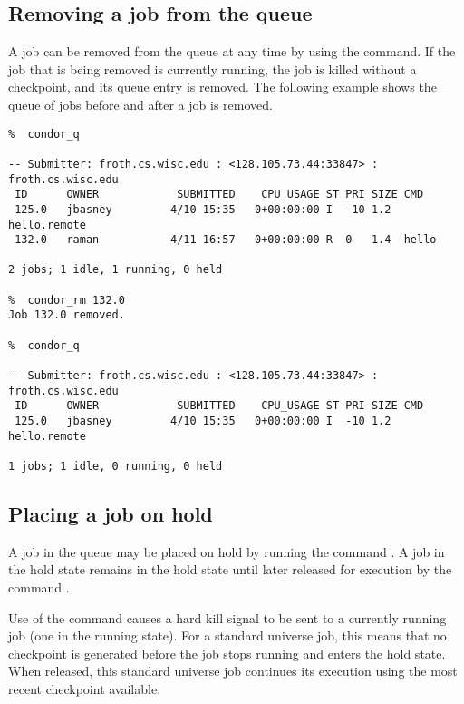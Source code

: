 \subsection{Removing a job from the queue}
A job can be removed from the queue at any time by using the 
command.  If the job that is being removed is currently running, the job
is killed without a checkpoint, and its queue entry is removed.  
The following example shows the queue of jobs before and after
a job is removed.
\footnotesize
\begin{verbatim}
%  condor_q

-- Submitter: froth.cs.wisc.edu : <128.105.73.44:33847> : froth.cs.wisc.edu
 ID      OWNER            SUBMITTED    CPU_USAGE ST PRI SIZE CMD               
 125.0   jbasney         4/10 15:35   0+00:00:00 I  -10 1.2  hello.remote      
 132.0   raman           4/11 16:57   0+00:00:00 R  0   1.4  hello             

2 jobs; 1 idle, 1 running, 0 held

%  condor_rm 132.0
Job 132.0 removed.

%  condor_q

-- Submitter: froth.cs.wisc.edu : <128.105.73.44:33847> : froth.cs.wisc.edu
 ID      OWNER            SUBMITTED    CPU_USAGE ST PRI SIZE CMD               
 125.0   jbasney         4/10 15:35   0+00:00:00 I  -10 1.2  hello.remote      

1 jobs; 1 idle, 0 running, 0 held
\end{verbatim}
\normalsize

\subsection{Placing a job on hold}
A job in the queue may be placed on hold by running the command
.
A job in the hold state remains in the hold state until later released
for execution by the command .

Use of the  command causes a hard kill signal to be sent
to a currently running job (one in the running state).
For a standard universe job, this means that no checkpoint is
generated before the job stops running and enters the hold state.
When released, this standard universe job continues its execution
using the most recent checkpoint available.

